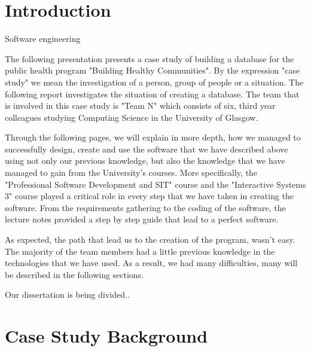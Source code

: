 \documentclass{l3proj}
\begin{document}
\educationalconsent

\newpage

\section{Introduction}

Software engineering 



The following presentation presents a case study of building a database for the public health program "Building Healthy Communities". By the expression "case study" we mean the investigation of a person, group of people or a situation. The following report investigates the situation of creating a database. The team that is involved in this case study is "Team N" which consists of six, third year colleagues studying Computing Science in the University of Glasgow.

Through the following pages, we will explain in more depth, how we managed to successfully design, create and use the software that we have described above using not only our previous knowledge, but also the knowledge that we have managed to gain from the University's courses. More specifically, the "Professional Software Development and SIT" course and the "Interactive Systems 3" course played a critical role in every step that we have taken in creating the software. From the requirements gathering to the coding of the software, the lecture notes provided a step by step guide that lead to a perfect software.

As expected, the path that lead us to the creation of the program, wasn't easy. The majority of the team members had a little previous knowledge in the technologies that we have used. As a result, we had many difficulties, many will be described in the following sections.


Our dissertation is being divided..

\section{Case Study Background}
\end{document}
